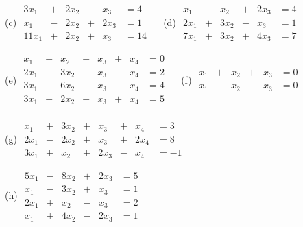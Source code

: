 \documentclass{article}
\theoremstyle{plain}
\theoremstyle{obs}
\numberwithin{equation}{section}
\begin{document}
\begin{enumerate}
      (c)
      $
      \begin{matrix}
        3x_1& + &2x_2&-&x_3&= 4\\
        x_1&-   &2x_2&+&2x_3&=1 \\
        11x_1&+ &2x_2&+&x_3&=14
       \end{matrix}
      $
      \ \ (d)
      $
      \begin{matrix}
        x_1& - &x_2& + &2x_3&= 4\\
        2x_1& + &3x_2& - &x_3&=1 \\
        7x_1&+ &3x_2&+&4x_3&= 7
       \end{matrix}
      $
      \\
      \newline 
      
      (e)
      $
      \begin{matrix}
        x_1& + &x_2& + &x_3&+&x_4&=0\\
        2x_1& + &3x_2& - &x_3&-&x_4&=2 \\
        3x_1&+ &6x_2& - &x_3&-&x_4&= 4 \\
        3x_1&+ &2x_2& + &x_3& + &x_4&= 5 \\
       \end{matrix}
      $
       \ \ (f)
      $
      \begin{matrix}
        x_1& + &x_2& + &x_3&= 0\\
        x_1& - &x_2& - &x_3&=0 \\
       \end{matrix}
      $
      \newline
      
      (g)
      $
      \begin{matrix}
         x_1& + &3x_2& + &x_3& + & x_4&=3\\
        2x_1& - &2x_2& + &x_3& + &2x_4&=8 \\
        3x_1& + & x_2& + &2x_3&-&x_4&= -1 
       \end{matrix}
      $
      \\
      \newline
      
      (h)
      $
      \begin{matrix}
        5x_1& - &8x_2& + &2x_3&=5\\
         x_1& - &3x_2& + &x_3&=1\\
        2x_1& + &x_2& - &x_3&=2 \\
         x_1& + &4x_2& - &2x_3&=1  
       \end{matrix}
      $
 

\end{enumerate}
\end{document}
